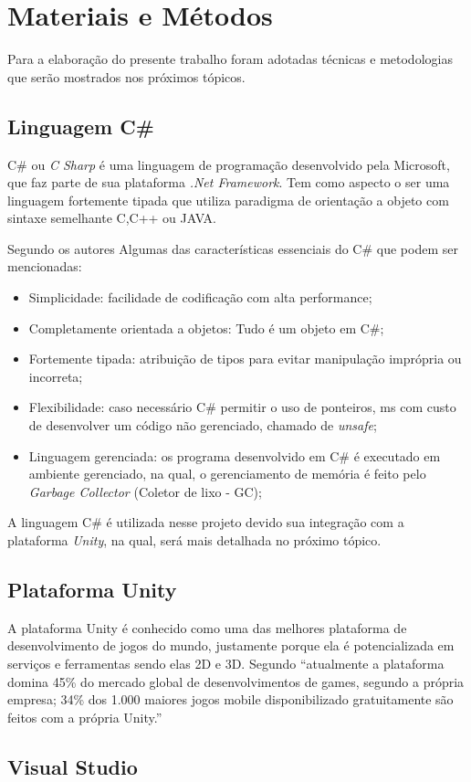 
\chapter{Materiais e Métodos}

Para a elaboração do presente trabalho foram adotadas técnicas e metodologias que serão mostrados nos próximos tópicos.

\section{Linguagem C\#}

C\# ou \textit{C Sharp} é uma linguagem de programação desenvolvido pela Microsoft, que faz parte de sua plataforma \textit{.Net Framework}. Tem como aspecto o ser uma linguagem fortemente tipada que utiliza paradigma de orientação a objeto com sintaxe semelhante C,C++ ou JAVA. 

Segundo os autores  Algumas das características essenciais do C\# que podem ser mencionadas:

\begin{itemize}
	\item Simplicidade: facilidade de codificação com alta performance;
	\item Completamente orientada a objetos: Tudo é um objeto em C\#;
	\item Fortemente tipada: atribuição de tipos para evitar manipulação imprópria ou incorreta;
	\item Flexibilidade: caso necessário C\# permitir o uso de ponteiros, ms com custo de desenvolver um código não gerenciado, chamado de \textit{unsafe};
	\item Linguagem  gerenciada: os programa desenvolvido em C\# é executado em ambiente gerenciado, na qual, o gerenciamento de memória é feito pelo \textit{Garbage Collector} (Coletor de lixo - GC);
\end{itemize}

A linguagem C\# é utilizada nesse projeto devido sua integração com a plataforma \textit{Unity}, na qual, será mais detalhada no próximo tópico.

\section{Plataforma Unity}

A plataforma Unity é conhecido como uma das melhores plataforma de desenvolvimento de jogos do mundo, justamente porque ela é potencializada em serviços e ferramentas sendo elas 2D e 3D.
Segundo  \enquote{atualmente a plataforma domina 45\% do mercado global de desenvolvimentos de games, segundo a própria empresa; 34\% dos 1.000 maiores jogos mobile disponibilizado gratuitamente são feitos com a própria Unity.}

\section{Visual Studio}

